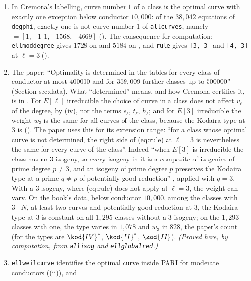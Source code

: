 \begin{sloppypar}
\begin{remark}\label{rem:computation:optimality-data}
\begin{enumerate}[label=(\roman*)]
\item In Cremona's labelling, curve number $1$ of a class is the optimal curve with exactly one exception below conductor $10{,}000$: of the
$38{,}042$ equations of \texttt{degphi}, exactly one is not curve number $1$ of \texttt{allcurves}, namely  $=[1,-1,1,-1568,-4669]$
(). The consequence for computation: \texttt{ellmoddegree} gives $1728$ on  and $5184$ on , and
\texttt{rule} gives \texttt{[3, 3]} and \texttt{[4, 3]} at $\ell=3$ ().
\item The paper: ``Optimality is determined in the tables for every class of conductor at most $400000$ and for $359{,}009$ further classes
up to $500000$'' (Section sec:data). What ``determined'' means, and how Cremona certifies it, is in . For $E[\ell]$ irreducible
the choice of curve in a class does not affect $v_\ell$ of the degree, by (iv), nor the terms $e_\ell$, $t_\ell$, $h_\ell$; and for $E[3]$ irreducible the
weight $w_3$ is the same for all curves of the class, because the Kodaira type at $3$ is (). The paper uses this for its
extension range: ``for a class whose optimal curve is not determined, the right side of (eq:rule) at $\ell=3$ is nevertheless the same for every curve
of the class''. Indeed ``when $E[3]$ is irreducible the class has no $3$-isogeny, so every isogeny in it is a composite of isogenies of prime degree
$p\ne3$, and an isogeny of prime degree $p$ preserves the Kodaira type at a prime $q\ne p$ of potentially good reduction'' \cite[Theorem 5.4(1)]{DokDok15},
applied with $q=3$. With a $3$-isogeny, where (eq:rule) does not apply at $\ell=3$, the weight can vary. On the book's data, below conductor
$10{,}000$, among the classes with $3\mid N$, at least two curves and potentially good reduction at $3$, the Kodaira type at $3$ is constant on all
$1{,}295$ classes without a $3$-isogeny; on the $1{,}293$ classes with one, the type varies in $1{,}078$ and $w_3$ in $828$, the paper's count (for
 the types are $\kod{IV}^*$, $\kod{II}^*$, $\kod{II}$). \emph{(Proved here, by computation, from \texttt{allisog} and \texttt{ellglobalred}.)}
\item \texttt{ellweilcurve} identifies the optimal curve inside PARI for moderate conductors ((ii)), and

\end{enumerate}
\end{remark}
\end{sloppypar}
